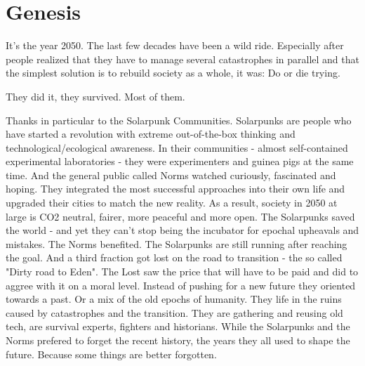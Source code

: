 \chapter{Genesis}

It's the year 2050. The last few decades have been a wild ride. Especially after people realized that they have to manage several catastrophes in parallel and that the simplest solution is to rebuild society as a whole, it was: Do or die trying.

They did it, they survived. Most of them.

Thanks in particular to the Solarpunk Communities. Solarpunks are people who have started a revolution with extreme out-of-the-box thinking and technological/ecological awareness. In their communities - almost self-contained experimental laboratories - they were experimenters and guinea pigs at the same time. And the general public called Norms watched curiously, fascinated and hoping. They integrated the most successful approaches into their own life and upgraded their cities to match the new reality.
As a result, society in 2050 at large is CO2 neutral, fairer, more peaceful and more open.
The Solarpunks saved the world - and yet they can't stop being the incubator for epochal upheavals and mistakes.
The Norms benefited. The Solarpunks are still running after reaching the goal. And a third fraction got lost on the road to transition - the so called "Dirty road to Eden". The Lost saw the price that will have to be paid and did to aggree with it on a moral level. Instead of pushing for a new future they oriented towards a past. Or a mix of the old epochs of humanity. They life in the ruins caused by catastrophes and the transition. They are gathering and reusing old tech, are survival experts, fighters and historians.
While the Solarpunks and the Norms prefered to forget the recent history, the years they all used to shape the future. Because some things are better forgotten.